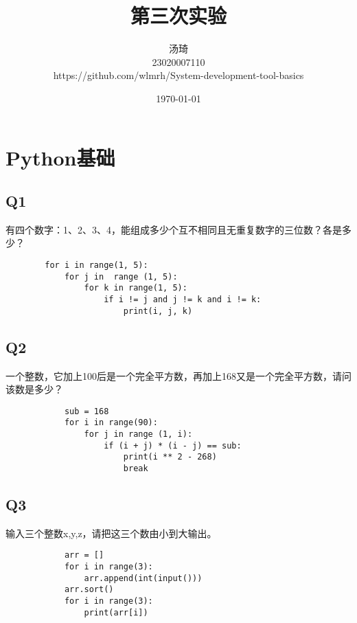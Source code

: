 \documentclass{article}
\begin{document}
    \title{第三次实验}
    \author{汤琦 \\ 23020007110\\ https://github.com/wlmrh/System-development-tool-basics}
    \date{\today}
    \maketitle

    \tableofcontents
    \newpage

    \setlength{\parindent}{0pt}
    \setcounter{page}{1}
    \sloppy
\section{Python基础}
    \subsection{Q1}
    有四个数字：1、2、3、4，能组成多少个互不相同且无重复数字的三位数？各是多少？
    \begin{verbatim}
        for i in range(1, 5):
            for j in  range (1, 5):
                for k in range(1, 5):
                    if i != j and j != k and i != k:
                        print(i, j, k)
    \end{verbatim}

    \subsection{Q2}
    一个整数，它加上100后是一个完全平方数，再加上168又是一个完全平方数，请问该数是多少？
        \begin{verbatim}
            sub = 168
            for i in range(90):
                for j in range (1, i):
                    if (i + j) * (i - j) == sub:
                        print(i ** 2 - 268)
                        break            
        \end{verbatim}
    
    \subsection{Q3}
    输入三个整数x,y,z，请把这三个数由小到大输出。
        \begin{verbatim}
            arr = []
            for i in range(3):
                arr.append(int(input()))
            arr.sort()
            for i in range(3):
                print(arr[i])
        \end{verbatim}
\end{document}

